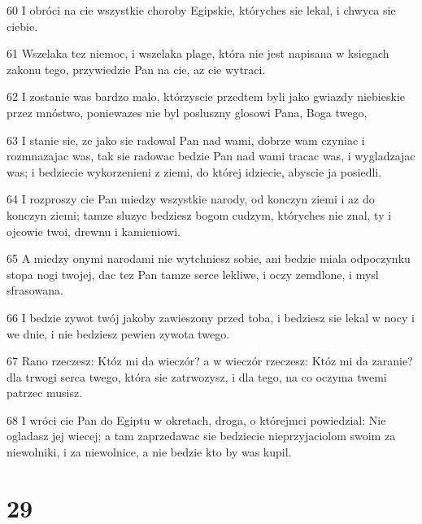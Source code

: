 \par 60 I obróci na cie wszystkie choroby Egipskie, któryches sie lekal, i chwyca sie ciebie.
\par 61 Wszelaka tez niemoc, i wszelaka plage, która nie jest napisana w ksiegach zakonu tego, przywiedzie Pan na cie, az cie wytraci.
\par 62 I zostanie was bardzo malo, którzyscie przedtem byli jako gwiazdy niebieskie przez mnóstwo, poniewazes nie byl posluszny glosowi Pana, Boga twego,
\par 63 I stanie sie, ze jako sie radowal Pan nad wami, dobrze wam czyniac i rozmnazajac was, tak sie radowac bedzie Pan nad wami tracac was, i wygladzajac was; i bedziecie wykorzenieni z ziemi, do której idziecie, abyscie ja posiedli.
\par 64 I rozproszy cie Pan miedzy wszystkie narody, od konczyn ziemi i az do konczyn ziemi; tamze sluzyc bedziesz bogom cudzym, któryches nie znal, ty i ojcowie twoi, drewnu i kamieniowi.
\par 65 A miedzy onymi narodami nie wytchniesz sobie, ani bedzie miala odpoczynku stopa nogi twojej, dac tez Pan tamze serce lekliwe, i oczy zemdlone, i mysl sfrasowana.
\par 66 I bedzie zywot twój jakoby zawieszony przed toba, i bedziesz sie lekal w nocy i we dnie, i nie bedziesz pewien zywota twego.
\par 67 Rano rzeczesz: Któz mi da wieczór? a w wieczór rzeczesz: Któz mi da zaranie? dla trwogi serca twego, która sie zatrwozysz, i dla tego, na co oczyma twemi patrzec musisz.
\par 68 I wróci cie Pan do Egiptu w okretach, droga, o którejmci powiedzial: Nie ogladasz jej wiecej; a tam zaprzedawac sie bedziecie nieprzyjaciolom swoim za niewolniki, i za niewolnice, a nie bedzie kto by was kupil.

\chapter{29}

